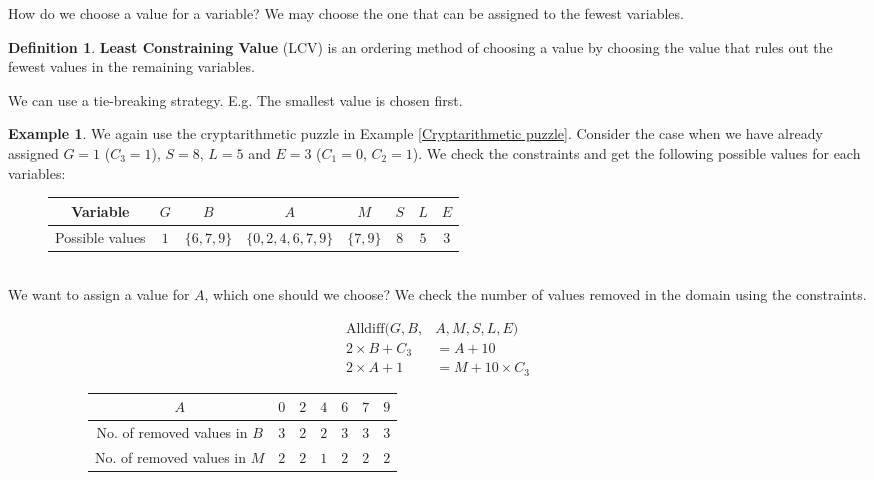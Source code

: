 \documentclass{article}
\theoremstyle{definition}
\newtheorem{definition}{Definition}[section]
\newtheorem{example}{Example}[definition]
\begin{document}
How do we choose a value for a variable? We may choose the one that can be assigned to the fewest variables.
\begin{definition}
	\textbf{Least Constraining Value} (LCV) is an ordering method of choosing a value by choosing the value that rules out the fewest values in the remaining variables.
\end{definition}
We can use a tie-breaking strategy. E.g. The smallest value is chosen first.
\begin{example}
	\label{LCV}
	We again use the cryptarithmetic puzzle in Example \ref{Cryptarithmetic puzzle}. Consider the case when we have already assigned $G=1$ ($C_{3}=1$), $S=8$, $L=5$ and $E=3$ ($C_{1}=0$, $C_{2}=1$). We check the constraints and get the following possible values for each variables: 
	\begin{figure}[h!]
		\centering
		\begin{tabular}{|c||c|c|c|c|c|c|c|}
			\hline
			Variable & $G$ & $B$ & $A$ & $M$ & $S$ & $L$ & $E$\\
			\hline
			Possible values & $1$ & $\{6,7,9\}$ & $\{0,2,4,6,7,9\}$ & $\{7,9\}$ & $8$ & $5$ & $3$\\
			\hline
		\end{tabular}
	\end{figure}\\
	We want to assign a value for $A$, which one should we choose? We check the number of values removed in the domain using the constraints.
	\begin{figure}[h!]
		\centering
		\begin{subfigure}[h]{0.3\textwidth}
			\begin{align*}
				\text{Alldiff}(G,B,&A,M,S,L,E)\\
				2\times B+C_{3}&=A+10\\
				2\times A+1&=M+10\times C_{3}
			\end{align*}
		\end{subfigure}
		\begin{subfigure}[h]{0.69\textwidth}
			\begin{tabular}{|c||c|c|c|c|c|c|}
				\hline
				$A$ & $0$ & $2$ & $4$ & $6$ & $7$ & $9$\\
				\hline
				No. of removed values in $B$ & $3$ & $2$ & $2$ & $3$ & $3$ & $3$\\
				No. of removed values in $M$ & $2$ & $2$ & $1$ & $2$ & $2$ & $2$\\
				\hline
			\end{tabular}
		\end{subfigure}

\end{figure}
\end{example}
\end{document}
